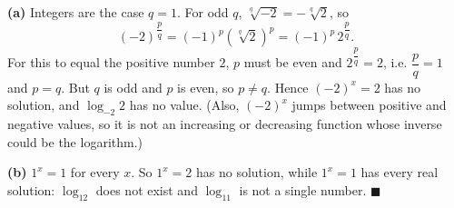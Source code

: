 \textbf{(a)} Integers are the case $q=1$. For odd $q$, $\sqrt[q]{-2}=-\sqrt[q]2$, so
\[(-2)^{\dfrac pq}=(-1)^p\left(\sqrt[q]2\right)^p=(-1)^p\,2^{\dfrac pq}.\]
For this to equal the positive number $2$, $p$ must be even and $2^{\dfrac pq}=2$, i.e. $\dfrac pq=1$ and $p=q$. But $q$ is odd and $p$ is even, so $p\ne q$. Hence $(-2)^x=2$ has no solution, and $\log_{-2}2$ has no value. (Also, $(-2)^x$ jumps between positive and negative values, so it is not an increasing or decreasing function whose inverse could be the logarithm.)

\textbf{(b)} $1^x=1$ for every $x$. So $1^x=2$ has no solution, while $1^x=1$ has every real solution: $\log_12$ does not exist and $\log_11$ is not a single number. $\blacksquare$
